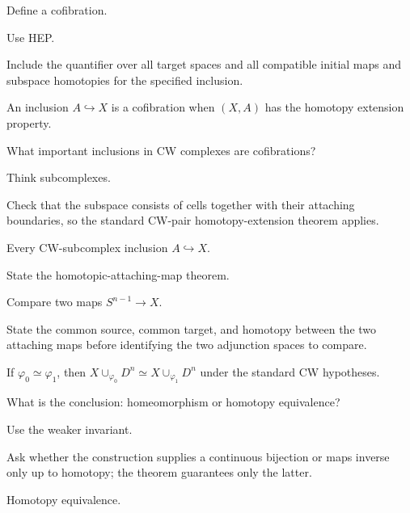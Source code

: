 \begin{exercise}\label{exr:viii08-02}
Define a cofibration.
\end{exercise}
\begin{hint}
Use HEP.

Include the quantifier over all target spaces and all compatible initial maps and subspace homotopies for the specified inclusion.
\end{hint}
\begin{solution}
An inclusion \(A\hookrightarrow X\) is a cofibration when \((X,A)\) has the homotopy extension property.
\end{solution}

\begin{exercise}\label{exr:viii08-03}
What important inclusions in CW complexes are cofibrations?
\end{exercise}
\begin{hint}
Think subcomplexes.

Check that the subspace consists of cells together with their attaching boundaries, so the standard CW-pair homotopy-extension theorem applies.
\end{hint}
\begin{solution}
Every CW-subcomplex inclusion \(A\hookrightarrow X\).
\end{solution}

\begin{exercise}\label{exr:viii08-04}
State the homotopic-attaching-map theorem.
\end{exercise}
\begin{hint}
Compare two maps \(S^{n-1}\to X\).

State the common source, common target, and homotopy between the two attaching maps before identifying the two adjunction spaces to compare.
\end{hint}
\begin{solution}
If \(\varphi_0\simeq\varphi_1\), then \(X\cup_{\varphi_0}D^n\simeq X\cup_{\varphi_1}D^n\) under the standard CW hypotheses.
\end{solution}

\begin{exercise}\label{exr:viii08-05}
What is the conclusion: homeomorphism or homotopy equivalence?
\end{exercise}
\begin{hint}
Use the weaker invariant.

Ask whether the construction supplies a continuous bijection or maps inverse only up to homotopy; the theorem guarantees only the latter.
\end{hint}
\begin{solution}
Homotopy equivalence.
\end{solution}

